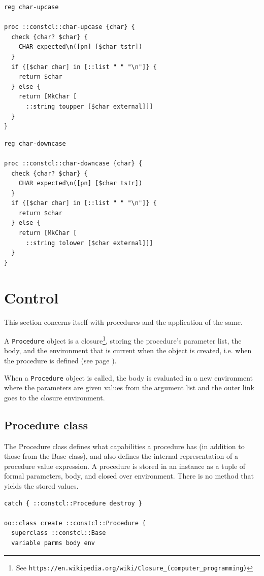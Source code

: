 \documentclass[a5paper,draft]{memoir}
\begin{document}
\begin{lstlisting}
reg char-upcase

proc ::constcl::char-upcase {char} {
  check {char? $char} {
    CHAR expected\n([pn] [$char tstr])
  }
  if {[$char char] in [::list " " "\n"]} {
    return $char
  } else {
    return [MkChar [
      ::string toupper [$char external]]]
  }
}
\end{lstlisting}

\begin{lstlisting}
reg char-downcase

proc ::constcl::char-downcase {char} {
  check {char? $char} {
    CHAR expected\n([pn] [$char tstr])
  }
  if {[$char char] in [::list " " "\n"]} {
    return $char
  } else {
    return [MkChar [
      ::string tolower [$char external]]]
  }
}
\end{lstlisting}

\section{Control}
\label{control}

This section concerns itself with procedures and the application of the same.

A \texttt{Procedure} object is a closure\footnote{See \texttt{https://en.wikipedia.org/wiki/Closure\_(computer\_programming)}}, storing the procedure's parameter list, the body, and the environment that is current when the object is created, i.e. when the procedure is defined (see page \pageref{procedure-definition}).

When a \texttt{Procedure} object is called, the body is evaluated in a new environment where the parameters are given values from the argument list and the outer link goes to the closure environment.

\subsection{Procedure class}
\label{procedure-class}

The Procedure class defines what capabilities a procedure has (in addition to those from the Base class), and also defines the internal representation of a procedure value expression. A procedure is stored in an instance as a tuple of formal parameters, body, and closed over environment. There is no method that yields the stored values.

\begin{lstlisting}
catch { ::constcl::Procedure destroy }

oo::class create ::constcl::Procedure {
  superclass ::constcl::Base
  variable parms body env
\end{lstlisting}
\end{document}
